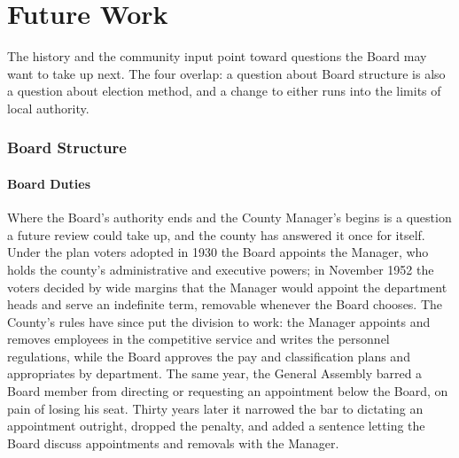 \part{Future Work}
\sectionbreaksfalse  %

The history and the community input point toward questions the Board may want
to take up next. The four overlap: a question about Board structure is also a
question about election method, and a change to either runs into the limits of
local authority.

\section{Board Structure}

\subsection{Board Duties}

Where the Board's authority ends and the County Manager's begins is a question
a future review could take up, and the county has answered it once for itself.
Under the plan voters adopted in 1930 the Board appoints the Manager, who holds
the county's administrative and executive powers; in November 1952 the voters
decided by wide margins that the Manager would appoint the department heads and
serve an indefinite term, removable whenever the Board
chooses.\autocite{vaacts1930c167,vaacts1952c198,dailysun1952results} The County's
rules have since put the division to work: the Manager appoints and removes
employees in the competitive service and writes the personnel regulations, while
the Board approves the pay and classification plans and appropriates by
department.\autocite{arlingtoncode6civilservice,arlingtonva2026budgetresolution}
The same year, the General Assembly barred a Board member from directing or
requesting an appointment below the Board, on pain of losing his
seat.\autocite{vaacts1952c443} Thirty years later it narrowed the bar to
dictating an appointment outright, dropped the penalty, and added a sentence
letting the Board discuss appointments and removals with the
Manager.\autocite{vaacts1982c108}

